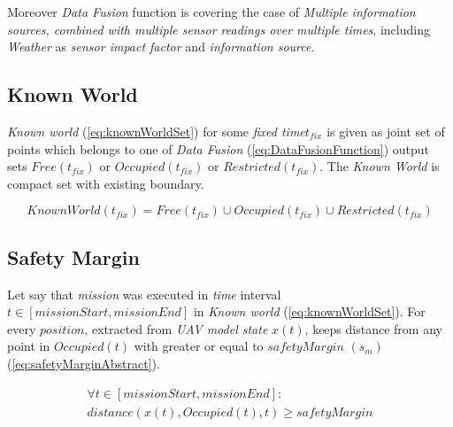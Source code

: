     
    \begin{note}
    Moreover \emph{Data Fusion} function is covering the case of \emph{Multiple information sources, combined with multiple sensor readings over multiple times}, including \emph{Weather} as \emph{sensor impact factor} and \emph{information source}. 
    \end{note}

\subsection{Known World}\label{s:KnownWorld}
   \noindent \emph{Known world} (\ref{eq:knownWorldSet}) for some \emph{fixed time}$t_{fix}$ is given as joint set of points which belongs to one of \emph{Data Fusion} (\ref{eq:DataFusionFunction}) output sets $Free(t_{fix})$ or $Occupied(t_{fix})$ or $Restricted(t_{fix})$. The \emph{Known World} is compact set with existing boundary.
    
    \begin{equation}\label{eq:knownWorldSet}
        KnownWorld(t_{fix})= Free(t_{fix}) \cup Occupied(t_{fix}) \cup Restricted(t_{fix})
    \end{equation}



\subsection{Safety Margin}\label{s:SafetyMarginDefinition}
    \noindent Let say that \emph{mission} was executed in \emph{time} interval $t\in [missionStart,missionEnd]$ in \emph{Known world} (\ref{eq:knownWorldSet}). For every $position$, extracted from \emph{UAV model state} $x(t)$, keeps distance from any point in $Occupied(t)$  with greater or equal to $safetyMargin$ $(s_m)$ (\ref{eq:safetyMarginAbstract}).  
    
    \begin{multline}\label{eq:safetyMarginAbstract}
        \forall t\in [missionStart,missionEnd]:\\distance(x(t),Occupied(t),t) \ge safetyMargin
    \end{multline}

